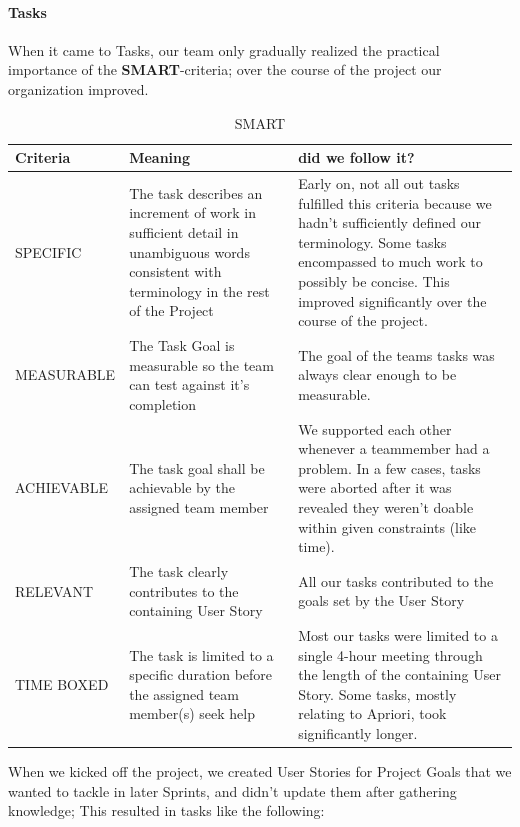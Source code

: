 \paragraph{Tasks} 
When it came to Tasks, our team only gradually realized the practical importance of the \textbf{ SMART}-criteria; over the course of the project our organization improved.


\begin{table}[h!]
  \caption{SMART}
  \label{SMART}
  \centering
  \begin{tabular}{|p{3cm} | p{5cm}| p{5cm}|}
	\hline  	 
  	 Criteria & Meaning & did we follow it? \\ 
  	 \hline
  	 \hline
  	\hfill \break SPECIFIC & 
  	The task describes an increment of work in sufficient detail in unambiguous words consistent with terminology in the rest of the Project & 
  	 Early on, not all out tasks fulfilled this criteria because we hadn't sufficiently defined our terminology. Some tasks encompassed to much work to possibly  be concise. This improved significantly over the course of the project.\\ 
  	\hline
  	\hfill \break MEASURABLE &
  	 The Task Goal is measurable so the team can test against it's completion & The goal of the teams tasks was always clear enough to be measurable. \\ 
  	\hline
  	\hfill \break ACHIEVABLE &
  	 The task goal shall be achievable by the assigned team member &
  	 We supported each other whenever a teammember had a problem. In a few cases, tasks were aborted after it was revealed they weren't doable within given constraints (like time).   \\ 
  	\hline
  	\hfill \break RELEVANT &
  	 The task clearly contributes to the containing User Story & 
  	 All our tasks contributed to the goals set by the User Story   \\ 
  	\hline
  	\hfill \break TIME BOXED &
  	 The task is limited to a specific duration before the assigned team member(s) seek help & Most our tasks were limited to a single 4-hour meeting through the length of the containing User Story. Some tasks, mostly relating to Apriori, took significantly longer. 
  	    \\ 
  	\hline
  	  \end{tabular}
\end{table}

When we kicked off the project, we created User Stories for Project Goals that we wanted to tackle in later Sprints, and didn't update them after gathering knowledge; This resulted in tasks like the following:


